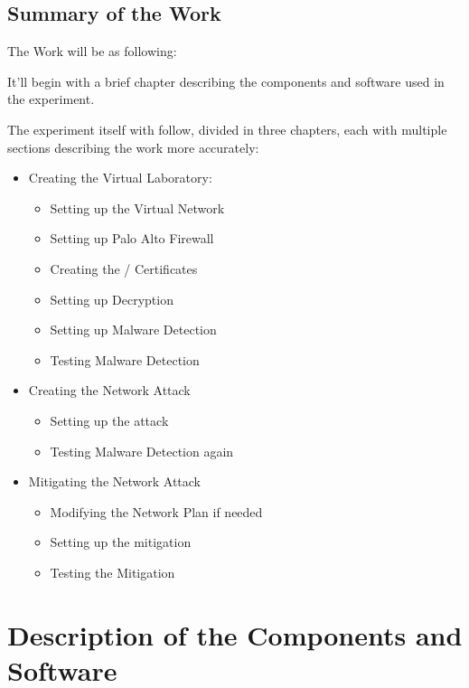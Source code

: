 
\section{Summary of the Work}

The Work will be as following:

It'll begin with a brief chapter describing the components and software used in the experiment.

The experiment itself with follow, divided in three chapters, each with multiple sections describing the work more accurately:

\begin{itemize}
    \item Creating the Virtual Laboratory:
    \begin{itemize}
        \item Setting up the Virtual Network
        \item Setting up Palo Alto Firewall
        \item Creating the / Certificates
        \item Setting up Decryption
        \item Setting up Malware Detection
        \item Testing Malware Detection
    \end{itemize}
    \item Creating the Network Attack
    \begin{itemize}
        \item Setting up the  attack
        \item Testing Malware Detection again
    \end{itemize}
    \item Mitigating the Network Attack
    \begin{itemize}
     \item Modifying the Network Plan if needed
     \item Setting up the mitigation
     \item Testing the Mitigation
    \end{itemize}

\end{itemize}

\chapter{Description of the Components and Software}

